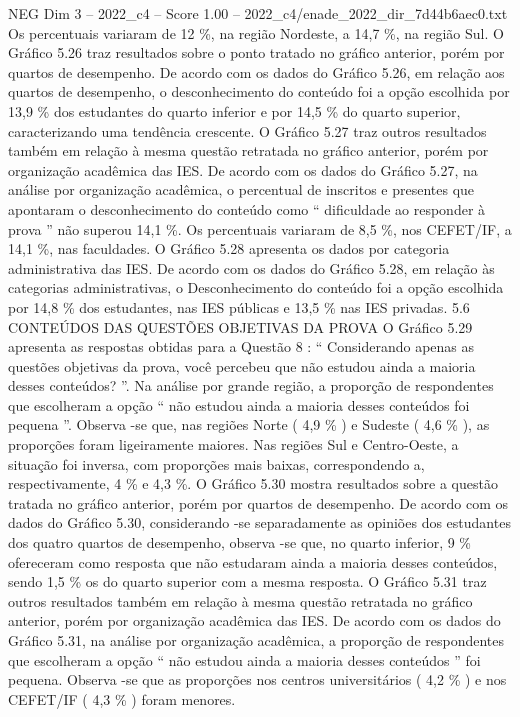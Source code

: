 \begin{textsample}{NEG Dim 3 – 2022\_c4 – Score 1.00 – 2022\_c4/enade\_2022\_dir\_7d44b6aec0.txt}
Os percentuais variaram de 12 \%, na região Nordeste, a 14,7 \%, na região Sul.
O Gráfico 5.26 traz resultados sobre o ponto tratado no gráfico anterior, porém por quartos de desempenho.
De acordo com os dados do Gráfico 5.26, em relação aos quartos de desempenho, o desconhecimento do conteúdo foi a opção escolhida por 13,9 \% dos estudantes do quarto inferior e por 14,5 \% do quarto superior, caracterizando uma tendência crescente.
O Gráfico 5.27 traz outros resultados também em relação à mesma questão retratada no gráfico anterior, porém por organização acadêmica das IES.
De acordo com os dados do Gráfico 5.27, na análise por organização acadêmica, o percentual de inscritos e presentes que apontaram o desconhecimento do conteúdo como “ dificuldade ao responder à prova ” não superou 14,1 \%.
Os percentuais variaram de 8,5 \%, nos CEFET/IF, a 14,1 \%, nas faculdades.
O Gráfico 5.28 apresenta os dados por categoria administrativa das IES.
De acordo com os dados do Gráfico 5.28, em relação às categorias administrativas, o Desconhecimento do conteúdo foi a opção escolhida por 14,8 \% dos estudantes, nas IES públicas e 13,5 \% nas IES privadas. 5.6 CONTEÚDOS DAS QUESTÕES OBJETIVAS DA PROVA O Gráfico 5.29 apresenta as respostas obtidas para a Questão 8 : “ Considerando apenas as questões objetivas da prova, você percebeu que não estudou ainda a maioria desses conteúdos? ”.
Na análise por grande região, a proporção de respondentes que escolheram a opção “ não estudou ainda a maioria desses conteúdos foi pequena ”.
Observa -se que, nas regiões Norte ( 4,9 \% ) e Sudeste ( 4,6 \% ), as proporções foram ligeiramente maiores.
Nas regiões Sul e Centro-Oeste, a situação foi inversa, com proporções mais baixas, correspondendo a, respectivamente, 4 \% e 4,3 \%.
O Gráfico 5.30 mostra resultados sobre a questão tratada no gráfico anterior, porém por quartos de desempenho.
De acordo com os dados do Gráfico 5.30, considerando -se separadamente as opiniões dos estudantes dos quatro quartos de desempenho, observa -se que, no quarto inferior, 9 \% ofereceram como resposta que não estudaram ainda a maioria desses conteúdos, sendo 1,5 \% os do quarto superior com a mesma resposta.
O Gráfico 5.31 traz outros resultados também em relação à mesma questão retratada no gráfico anterior, porém por organização acadêmica das IES.
De acordo com os dados do Gráfico 5.31, na análise por organização acadêmica, a proporção de respondentes que escolheram a opção “ não estudou ainda a maioria desses conteúdos ” foi pequena.
Observa -se que as proporções nos centros universitários ( 4,2 \% ) e nos CEFET/IF ( 4,3 \% ) foram menores.

\end{textsample}
